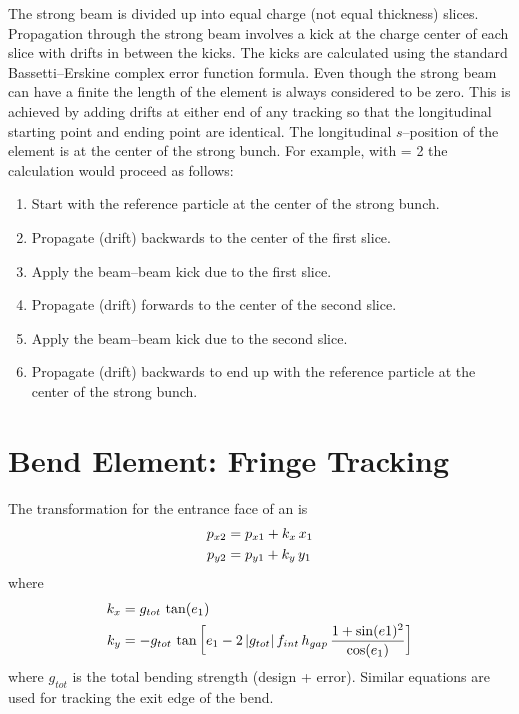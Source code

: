 The strong beam is divided up into  equal charge (not
equal thickness) slices. Propagation through the strong beam involves
a kick at the charge center of each slice with drifts in between the
kicks. The kicks are calculated using the standard Bassetti--Erskine
complex error function formula\cite{b:talman}.  Even though the strong
beam can have a finite  the length of the element is always
considered to be zero. This is achieved by adding drifts at either end
of any tracking so that the longitudinal starting point and ending
point are identical. The longitudinal $s$--position of the
 element is at the center of the strong bunch. For
example, with  = 2 the calculation would proceed as
follows:
\begin{enumerate}
  \item  Start with the reference particle at the center of the strong bunch.
  \item  Propagate (drift) backwards to the center of the first slice.
  \item  Apply the beam--beam kick due to the first slice.
  \item  Propagate (drift) forwards to the center of the second slice.
  \item  Apply the beam--beam kick due to the second slice.
  \item  Propagate (drift) backwards to end up with the reference particle
     at the center of the strong bunch.
\end{enumerate}

\section{Bend Element: Fringe Tracking}
\label{s:.bend.fringe.std}

The transformation for the entrance face of an  is
\begin{align}
  p_{x2} &= p_{x1} + k_x \, x_1 \nonumber \\
  p_{y2} &= p_{y1} + k_y \, y_1
\end{align}
where
\begin{align}
  k_x &= g_{tot} \, \tan(e_1) \nonumber \\
  k_y &= -g_{tot} \, \tan \left[ e_1 - 2 \, |g_{tot}| \, f_{int} \,  h_{gap} \, 
    \frac{1 + \sin(e1)^2}{\cos(e_1)} \right]
\end{align}
where $g_{tot}$ is the total bending strength (design +
error). Similar equations are used for tracking the exit edge of the
bend.

